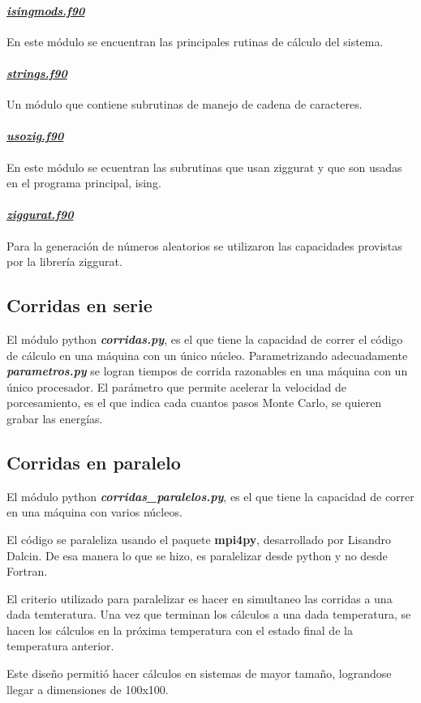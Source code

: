 \paragraph{\underline{\textit{isingmods.f90}}} 
En este m\'odulo  se encuentran las principales rutinas de c\'alculo del
sistema.


\paragraph{\underline{\textit{strings.f90}}}
Un m\'odulo que contiene subrutinas de manejo de cadena de caracteres.


\paragraph{\underline{\textit{usozig.f90}}} 
En este m\'odulo se ecuentran las subrutinas que usan ziggurat y que
son usadas en el programa principal, ising.
					
					
\paragraph{\underline{\textit{ziggurat.f90}}}

Para la generaci\'on de n\'umeros aleatorios se utilizaron
las capacidades provistas por la librer\'ia ziggurat. 


\subsection{Corridas en serie}\label{serie}
El módulo python \textbf{\textit{corridas.py}}, es el que tiene la capacidad de correr
el código de cálculo en una máquina con un único núcleo. Parametrizando adecuadamente
\textbf{\textit{parametros.py}} se logran tiempos de corrida razonables en una máquina
con un único procesador. El parámetro que permite acelerar la velocidad de porcesamiento, 
es el que indica cada cuantos pasos Monte Carlo, se quieren grabar las energías.

\subsection{Corridas en paralelo}\label{paralelo}

El módulo python \textbf{\textit{corridas_paralelos.py}}, es el que tiene la capacidad de correr
en una máquina con varios núcleos.

El código se paraleliza usando el paquete \textbf{mpi4py}, desarrollado por Lisandro Dalcin.
De esa manera lo que se hizo, es paralelizar desde python y no desde Fortran.

El criterio utilizado para paralelizar es hacer en simultaneo  las corridas a una dada temteratura. 
Una vez que terminan los cálculos a una dada temperatura, se hacen los cálculos en la próxima
temperatura con el estado final de la temperatura anterior.

Este diseño permitió hacer cálculos en sistemas de mayor tamaño, lograndose llegar a dimensiones
de 100x100.

